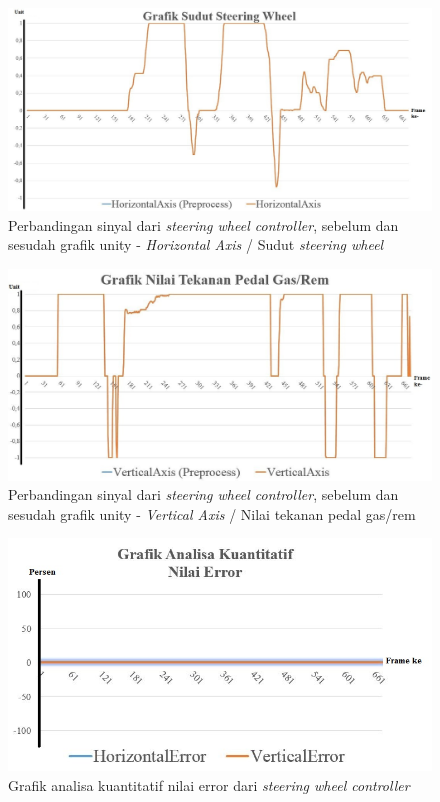 \begin{figure} [!htb]
	\captionsetup{justification=centering}
	\includegraphics[scale=0.3]{img/response_horz.JPG}
	\caption{Perbandingan sinyal dari \textit{steering wheel controller}, sebelum dan sesudah grafik unity - \textit{Horizontal Axis} / Sudut \textit{steering wheel}}
	\label{fig:4.6}
\end{figure}

\begin{figure} [!htb]
	\captionsetup{justification=centering}
	\includegraphics[scale=0.3]{img/response_vert.JPG}
	\caption{Perbandingan sinyal dari \textit{steering wheel controller}, sebelum dan sesudah grafik unity - \textit{Vertical Axis} / Nilai tekanan pedal gas/rem}
	\label{fig:4.7}
\end{figure}

\begin{figure} [!htb]
	\captionsetup{justification=centering}
	\includegraphics[scale=0.6]{img/grafik-error.JPG}
	\caption{Grafik analisa kuantitatif nilai error dari \textit{steering wheel controller}}
	\label{fig:4.8}
\end{figure}

